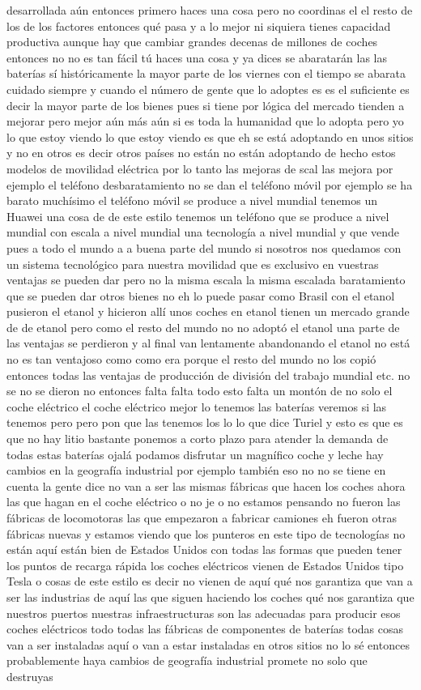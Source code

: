 desarrollada aún entonces primero haces una cosa pero no coordinas el el resto de los de los factores entonces qué pasa y a lo mejor ni siquiera tienes capacidad productiva aunque hay que cambiar grandes decenas de millones de coches entonces no no es tan fácil tú haces una cosa y ya dices se abaratarán las las baterías sí históricamente la mayor parte de los viernes con el tiempo se abarata cuidado siempre y cuando el número de gente que lo adoptes es es el suficiente es decir la mayor parte de los bienes pues si tiene por lógica del mercado tienden a mejorar pero mejor aún más aún si es toda la humanidad que lo adopta pero yo lo que estoy viendo lo que estoy viendo es que eh se está adoptando en unos sitios y no en otros es decir otros países no están no están adoptando de hecho estos modelos de movilidad eléctrica por lo tanto las mejoras de scal las mejora por ejemplo el teléfono desbaratamiento no se dan el teléfono móvil por ejemplo se ha barato muchísimo el teléfono móvil se produce a nivel mundial tenemos un Huawei una cosa de de este estilo tenemos un teléfono que se produce a nivel mundial con escala a nivel mundial una tecnología a nivel mundial y que vende pues a todo el mundo a a buena parte del mundo si nosotros nos quedamos con un sistema tecnológico para nuestra movilidad que es exclusivo en vuestras ventajas se pueden dar pero no la misma escala la misma escalada baratamiento que se pueden dar otros bienes no eh lo puede pasar como Brasil con el etanol pusieron el etanol y hicieron allí unos coches en etanol tienen un mercado grande de de etanol pero como el resto del mundo no no adoptó el etanol una parte de las ventajas se perdieron y al final van lentamente abandonando el etanol no está no es tan ventajoso como como era porque el resto del mundo no los copió entonces todas las ventajas de producción de división del trabajo mundial etc. no se no se dieron no entonces falta falta todo esto falta un montón de no solo el coche eléctrico el coche eléctrico mejor lo tenemos las baterías veremos si las tenemos pero pero pon que las tenemos los lo lo que dice Turiel y esto es que es que no hay litio bastante ponemos a corto plazo para atender la demanda de todas estas baterías ojalá podamos disfrutar un magnífico coche y leche hay cambios en la geografía industrial por ejemplo también eso no no se tiene en cuenta la gente dice no van a ser las mismas fábricas que hacen los coches ahora las que hagan en el coche eléctrico o no je o no estamos pensando no fueron las fábricas de locomotoras las que empezaron a fabricar camiones eh fueron otras fábricas nuevas y estamos viendo que los punteros en este tipo de tecnologías no están aquí están bien de Estados Unidos con todas las formas que pueden tener los puntos de recarga rápida los coches eléctricos vienen de Estados Unidos tipo Tesla o cosas de este estilo es decir no vienen de aquí qué nos garantiza que van a ser las industrias de aquí las que siguen haciendo los coches qué nos garantiza que nuestros puertos nuestras infraestructuras son las adecuadas para producir esos coches eléctricos todo todas las fábricas de componentes de baterías todas cosas van a ser instaladas aquí o van a estar instaladas en otros sitios no lo sé entonces probablemente haya cambios de geografía industrial promete no solo que destruyas 